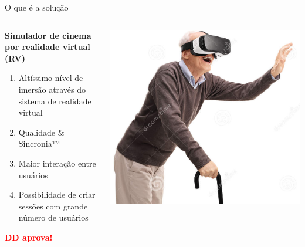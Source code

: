 \documentclass[12pt]{beamer}
\begin{document}
\begin{frame}{O que é a solução}
    \begin{columns}
        \begin{column}{0.65\textwidth}
        \textbf{Simulador de cinema por realidade virtual (RV)}
            \begin{enumerate}[label=•]
                \item Altíssimo nível de imersão através do sistema de realidade virtual
                \item Qualidade \& Sincronia™
                \item Maior interação entre usuários
                \item Possibilidade de criar sessões com grande número de usuários
            \end{enumerate}
            
            \vspace{3mm}
            \textbf{\textcolor{red}{DD aprova!}}
        \end{column}
        \begin{column}{0.35\textwidth}
            \begin{center}
                \includegraphics[width=1\textwidth]{figuras/ddaprova}
             \end{center}
        \end{column}
    \end{columns}
\end{frame}
\end{document}
